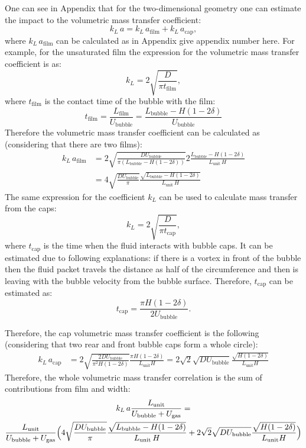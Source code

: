 \documentclass{article}
\newcommand{\beq}{\begin{equation}}
\newcommand{\feq}{\end{equation}}
\newcommand{\beqal}{\begin{equation}\begin{aligned}}
\newcommand{\feqal}{\end{aligned}\end{equation}}
\newcommand{\vol}{k_L\,a}
\newcommand{\lbubble}{L_{\mathrm{bubble}}}
\newcommand{\lunit}{L_{\mathrm{unit}}}
\newcommand{\lfilm}{L_{\mathrm{film}}}
\newcommand{\ububble}{U_{\mathrm{bubble}}}
\newcommand{\ugas}{U_{\mathrm{gas}}}
\newcommand{\volnondim}{\vol \frac{\lunit}{\ububble+\ugas}}
\newcommand{\volfilm}{k_L\, a_{\mathrm{film}}}
\newcommand{\volcap}{k_L\, a_{\mathrm{cap}}}
\newcommand{\tfilm}{t_{\mathrm{film}}}
\newcommand{\tcap}{t_{\mathrm{cap}}}
\begin{document}
\begin{description}
One can see in Appendix that for the two-dimensional geometry one can estimate the impact to the volumetric mass transfer coefficient:
\beq
\vol=\volfilm+\volcap,
\feq
where $\volfilm$ can be calculated as in Appendix {\color{red} give appendix number here}. For
example, for the unsaturated film the expression for the volumetric mass transfer coefficient is as:
\beq
k_L=2\sqrt{\frac{D}{\pi \tfilm}},
\feq
where $\tfilm$ is the contact time of the bubble with the film:
\beq
\tfilm=\frac{\lfilm}{\ububble}=\frac{\lbubble-H(1-2\delta)}{\ububble}
\feq
Therefore the volumetric mass transfer coefficient can be calculated as (considering that there are
two films):
\beqal
\volfilm&=2\sqrt{\frac{D \ububble}{\pi (\lbubble-H(1-2\delta))}} 2 \frac{
\lbubble-H(1-2\delta)}{\lunit\,H}\\
&=4\sqrt{\frac{D \ububble}{\pi}} \frac{
\sqrt{\lbubble-H(1-2\delta)}}{\lunit\,H}
\feqal
The same expression for the coefficient $k_L$ can be used to calculate mass transfer from the caps:
\beq
k_L=2\sqrt{\frac{D}{\pi \tcap}},
\feq
where $\tcap$ is the time when the fluid interacts with bubble caps. It can be estimated due to
following explanations: if there is a vortex in front of the bubble then the fluid packet travels
the distance as half of the circumference and then is leaving with the bubble velocity from the
bubble surface. Therefore, $\tcap$ can be estimated as:
\beq
\tcap=\frac{\pi H(1-2\delta)}{2 \ububble}.
\feq
\end{description}
Therefore, the cap volumetric mass transfer coefficient is the following (considering that two rear
and front bubble caps form a whole circle):
\beqal
\volcap&=2 \sqrt{\frac{2 D \ububble}{\pi^2 H(1-2\delta) }} \frac{\pi H(1-2\delta)}{\lunit
H}=2\sqrt{2} \sqrt{D \ububble}\frac{\sqrt{H (1-2\delta)}}{\lunit H}
\feqal
Therefore, the whole volumetric mass transfer correlation is the sum of contributions from film and
width:
\begin{multline}
\volnondim=\\
\frac{\lunit}{\ububble+\ugas}\Bigl(4\sqrt{\frac{D \ububble}{\pi}} \frac{
\sqrt{\lbubble-H(1-2\delta)}}{\lunit\,H}+2\sqrt{2} \sqrt{D \ububble}\frac{\sqrt{H
(1-2\delta)}}{\lunit H}\Bigr)
\end{multline}
\end{document}
